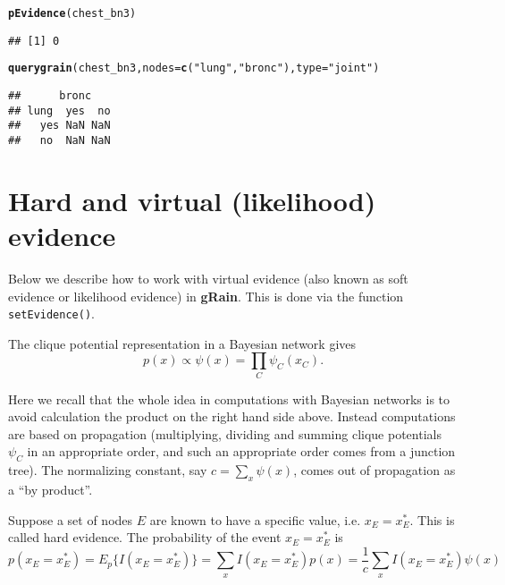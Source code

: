 \documentclass[10pt]{article}\usepackage[]{graphicx}\usepackage[]{xcolor}
\makeatletter
\newcommand{\hlstr}[1]{\textcolor[rgb]{0.192,0.494,0.8}{#1}}%
\newcommand{\hlstd}[1]{\textcolor[rgb]{0.345,0.345,0.345}{#1}}%
\newcommand{\hlkwc}[1]{\textcolor[rgb]{0.333,0.667,0.333}{#1}}%
\newcommand{\hlkwd}[1]{\textcolor[rgb]{0.737,0.353,0.396}{\textbf{#1}}}%
\newenvironment{kframe}{%
 \def\at@end@of@kframe{}%
 \ifinner\ifhmode%
  \def\at@end@of@kframe{\end{minipage}}%
  \begin{minipage}{\columnwidth}%
 \fi\fi%
 \def\FrameCommand##1{\hskip\@totalleftmargin \hskip-\fboxsep
 \colorbox{shadecolor}{##1}\hskip-\fboxsep
     \hskip-\linewidth \hskip-\@totalleftmargin \hskip\columnwidth}%
 \MakeFramed {\advance\hsize-\width
   \@totalleftmargin\z@ \linewidth\hsize
   \@setminipage}}%
 {\par\unskip\endMakeFramed%
 \at@end@of@kframe}
\newenvironment{knitrout}{}{} %
\def\grbn{{\bf gRain}}
\def\code#1{{\texttt{#1}}}
\makeatother
\begin{document}
\begin{knitrout}
\color{fgcolor}\begin{kframe}
\begin{alltt}
\hlkwd{pEvidence}\hlstd{(chest_bn3)}
\end{alltt}
\begin{verbatim}
## [1] 0
\end{verbatim}
\begin{alltt}
\hlkwd{querygrain}\hlstd{(chest_bn3,} \hlkwc{nodes}\hlstd{=}\hlkwd{c}\hlstd{(}\hlstr{"lung"}\hlstd{,} \hlstr{"bronc"}\hlstd{),} \hlkwc{type}\hlstd{=}\hlstr{"joint"}\hlstd{)}
\end{alltt}
\begin{verbatim}
##      bronc
## lung  yes  no
##   yes NaN NaN
##   no  NaN NaN
\end{verbatim}
\end{kframe}
\end{knitrout}




\section{Hard  and virtual (likelihood) evidence}
\label{sec:hard-virt-likel}
\label{sec:hard-soft}

Below we describe  how to work with virtual evidence (also known
as soft evidence or likelihood evidence) in \grbn. This is done via the function
\code{setEvidence()}.

The clique potential representation in a Bayesian network gives
\begin{displaymath}
  p(x) \propto \psi(x) = \prod_{C} \psi_C(x_C).
\end{displaymath}

Here we recall that the whole idea in computations with Bayesian
networks is to avoid calculation the product on the right hand
side above. Instead computations are based on propagation (multiplying,
dividing and summing clique potentials $\psi_C$ in an appropriate
order, and such an appropriate order comes from a junction tree).
The normalizing constant, say $c=\sum_x \psi(x)$, comes out of
propagation as a ``by product''.

Suppose a set of nodes $E$ are known to have a specific value,
i.e. $x_E=x^*_E$. This is called hard evidence. The probability of
the event $x_E=x^*_E$ is
\begin{displaymath}
  p(x_E=x^*_E)=E_p\{I(x_E=x^*_E)\} = \sum_x I(x_E=x^*_E) p(x)
  = \frac{1}{c} \sum_x I(x_E=x^*_E) \psi(x)
\end{displaymath}
\end{document}
